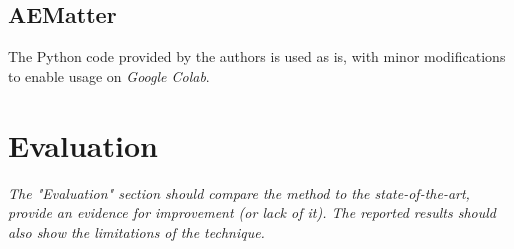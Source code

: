 \documentclass{article}
\theoremstyle{definition}
\begin{document}
\begin{multicols}{2}[]
\subsection{AEMatter}
The Python code provided by the authors is used as is, with minor modifications to enable usage on \emph{Google Colab}.

\section{Evaluation}\label{evaluation}
\emph{The "Evaluation" section should compare the method to the state-of-the-art, provide an evidence for improvement (or lack of it). The reported results should also show the limitations of the technique.}





\end{multicols}
\end{document}
